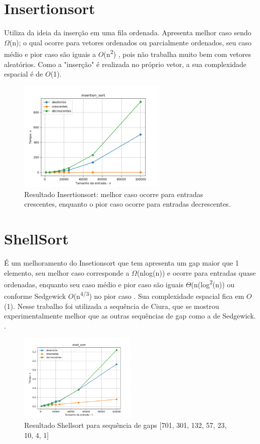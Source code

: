\documentclass[10pt,a4paper]{article}
\begin{document}
\section{Insertionsort}
    \indent Utiliza da ideia da inserção em uma fila ordenada. Apresenta melhor caso sendo $\Omega$(n); o qual ocorre para vetores ordenados ou parcialmente ordenados, seu caso médio e pior caso são iguais a $O$(n\textsuperscript{2}) \cite{tarundeep}, pois não trabalha muito bem com vetores aleatórios. Como a "inserção" é realizada no próprio vetor, a sua complexidade espacial é de $O$(1).
    \begin{figure}[H]
    	\centering
    	\includegraphics[width=0.63\textwidth]{Resultados/Graficos/insertion_sort.png}
    	\caption{Resultado Insertionsort: melhor caso ocorre para entradas crescentes, enquanto o pior caso ocorre para entradas decrescentes.}
    \end{figure}

\section{ShellSort}
    \indent É um melhoramento do Insetionsort que tem apresenta um gap maior que 1 elemento, seu melhor caso corresponde a $\Omega$(nlog(n)) e ocorre para entradas quase ordenadas, enquanto seu caso médio e pior caso são iguais $\Theta$(n(log\textsuperscript{2}(n)) ou  conforme Sedgewick  $O$(n\textsuperscript{4/3}) no pior caso \cite{sedgewick}. Sua complexidade espacial fica em $O$(1). Nesse trabalho foi utilizada a sequência de Ciura, que se mostrou experimentalmente melhor que as outras sequências de gap como a de Sedgewick. \cite{ciura}.
    \begin{figure}[H]
    	\centering
    	\includegraphics[width=0.5\textwidth]{Resultados/Graficos/shell_sort.png}
    	\caption{Resultado Shellsort para sequência de gaps [701, 301, 132, 57, 23, 10, 4, 1]}
    \end{figure}
\end{document}
